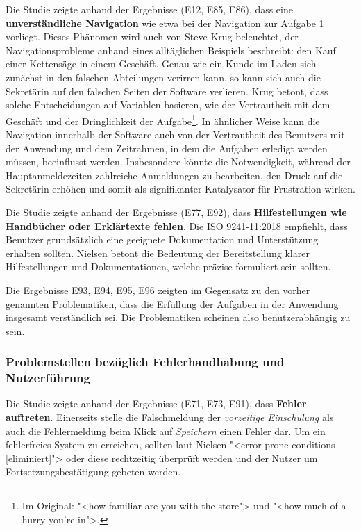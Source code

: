 Die Studie zeigte anhand der Ergebnisse (E12, E85, E86), dass eine \textbf{unverständliche Navigation} wie etwa bei der Navigation zur Aufgabe 1 vorliegt. Dieses Phänomen wird auch von Steve Krug beleuchtet, der Navigationsprobleme anhand eines alltäglichen Beispiels beschreibt: den Kauf einer Kettensäge in einem Geschäft. Genau wie ein Kunde im Laden sich zunächst in den falschen Abteilungen verirren kann, so kann sich auch die Sekretärin auf den falschen Seiten der Software verlieren. Krug betont, dass solche Entscheidungen auf Variablen basieren, wie der Vertrautheit mit dem Geschäft und der Dringlichkeit der Aufgabe\footnote{Im Original: "<how familiar are you with the store"> und "<how much of a hurry you're in">.}.\cite{krug} In ähnlicher Weise kann die Navigation innerhalb der Software auch von der Vertrautheit des Benutzers mit der Anwendung und dem Zeitrahmen, in dem die Aufgaben erledigt werden müssen, beeinflusst werden. Insbesondere könnte die Notwendigkeit, während der Hauptanmeldezeiten zahlreiche Anmeldungen zu bearbeiten, den Druck auf die Sekretärin erhöhen und somit als signifikanter Katalysator für Frustration wirken.

Die Studie zeigte anhand der Ergebnisse (E77, E92), dass \textbf{Hilfestellungen wie Handbücher oder Erklärtexte fehlen}. Die ISO 9241-11:2018 empfiehlt, dass Benutzer grundsätzlich eine geeignete Dokumentation und Unterstützung erhalten sollten.\cite{iso9241-11} Nielsen betont die Bedeutung der Bereitstellung klarer Hilfestellungen und Dokumentationen, welche präzise formuliert sein sollten.\cite{Nielsen10}

Die Ergebnisse E93, E94, E95, E96 zeigten im Gegensatz zu den vorher genannten Problematiken, dass die Erfüllung der Aufgaben in der Anwendung insgesamt verständlich sei. Die Problematiken scheinen also benutzerabhängig zu sein.

\subsubsection{Problemstellen bezüglich Fehlerhandhabung und Nutzerführung}
Die Studie zeigte anhand der Ergebnisse (E71, E73, E91), dass \textbf{Fehler auftreten}. Einerseits stelle die Falschmeldung der \textit{vorzeitige Einschulung} als auch die Fehlermeldung beim Klick auf \textit{Speichern} einen Fehler dar. Um ein fehlerfreies System zu erreichen, sollten laut Nielsen "<error-prone conditions [eliminiert]"> oder diese rechtzeitig überprüft werden und der Nutzer um Fortsetzungsbestätigung gebeten werden. \cite{Nielsen10} 

